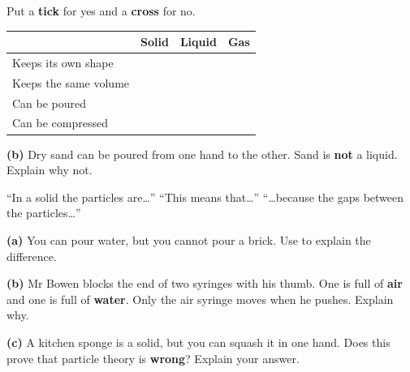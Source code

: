 \documentclass[12pt,a4paper]{article}
\newcommand{\qlines}[1]{\par\needspace{\numexpr#1+1\relax\baselineskip}\wlines{#1}}
\begin{document}

\noindent Put a \textbf{tick} for yes and a \textbf{cross} for no.

\vspace{7pt}
\noindent
\begin{tabularx}{\textwidth}{|X|c|c|c|}
  \hline
  & \textbf{Solid} & \textbf{Liquid} & \textbf{Gas} \\
  \hline
  Keeps its own shape \rule[-0.65em]{0pt}{2.0em}          & & & \\ \hline
  Keeps the same volume \rule[-0.65em]{0pt}{2.0em}        & & & \\ \hline
  Can be poured \rule[-0.65em]{0pt}{2.0em}                & & & \\ \hline
  Can be compressed \rule[-0.65em]{0pt}{2.0em}            & & & \\ \hline
\end{tabularx}

\vspace{9pt}
\noindent \textbf{(b)} Dry sand can be poured from one hand to the other. Sand is
\textbf{not} a liquid. Explain why not.
\qlines{2}


\begin{wordhelp}
  ``In a solid the particles are\ldots'' \qquad
  ``This means that\ldots'' \qquad
  ``\ldots because the gaps between the particles\ldots''
\end{wordhelp}

\noindent \textbf{(a)} You can pour water, but you cannot pour a brick. Use
 to explain the difference.
\qlines{2}

\vspace{4pt}
\noindent \textbf{(b)} Mr Bowen blocks the end of two syringes with his thumb. One is
full of \textbf{air} and one is full of \textbf{water}. Only the air syringe moves when
he pushes. Explain why.
\qlines{2}

\vspace{4pt}
\noindent \textbf{(c)} A kitchen sponge is a solid, but you can squash it in one hand.
Does this prove that particle theory is \textbf{wrong}? Explain your answer.
\qlines{3}

\end{document}
